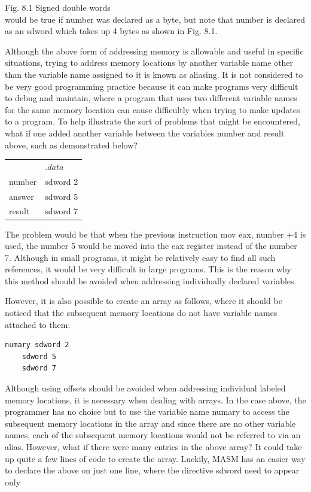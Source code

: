 \documentclass[10pt]{book}
\begin{document}
\begin{center}
\begin{center}
Fig. 8.1 Signed double words\\
would be true if number was declared as a byte, but note that number is declared as an sdword which takes up 4 bytes as shown in Fig. 8.1.

Although the above form of addressing memory is allowable and useful in specific situations, trying to address memory locations by another variable name other than the variable name assigned to it is known as aliasing. It is not considered to be very good programming practice because it can make programs very difficult to debug and maintain, where a program that uses two different variable names for the same memory location can cause difficultly when trying to make updates to a program. To help illustrate the sort of problems that might be encountered, what if one added another variable between the variables number and result above, such as demonstrated below?

\begin{center}
\begin{tabular}{ll}
 & .$d a t a$ \\
number & sdword 2 \\
answer & sdword 5 \\
result & sdword 7 \\
\end{tabular}
\end{center}

The problem would be that when the previous instruction mov eax, number +4 is used, the number 5 would be moved into the eax register instead of the number 7. Although in small programs, it might be relatively easy to find all such references, it would be very difficult in large programs. This is the reason why this method should be avoided when addressing individually declared variables.

However, it is also possible to create an array as follows, where it should be noticed that the subsequent memory locations do not have variable names attached to them:

\begin{verbatim}
numary sdword 2
    sdword 5
    sdword 7
\end{verbatim}

Although using offsets should be avoided when addressing individual labeled memory locations, it is necessary when dealing with arrays. In the case above, the programmer has no choice but to use the variable name numary to access the subsequent memory locations in the array and since there are no other variable names, each of the subsequent memory locations would not be referred to via an alias. However, what if there were many entries in the above array? It could take up quite a few lines of code to create the array. Luckily, MASM has an easier way to declare the above on just one line, where the directive sdword need to appear only


\end{center}
\end{center}
\end{document}
